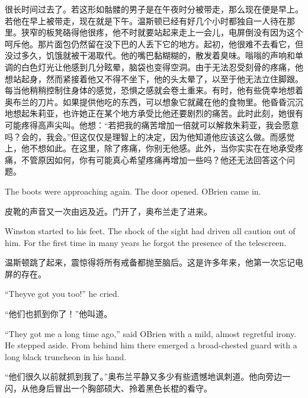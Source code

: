 \begin{paracol}{2}
\switchcolumn

很长时间过去了。若这形如骷髅的男子是在午夜时分被带走，那么现在便是早上。若他在早上被带走，现在就是下午。温斯顿已经有好几个小时都独自一人待在那里。狭窄的板凳硌得他很疼，他不时就要站起来走上一会儿，电屏倒没有因为这个呵斥他。那片面包仍然留在没下巴的人丢下它的地方。起初，他很难不去看它，但没过多久，饥饿就被干渴取代。他的嘴巴黏糊糊的，散发着臭味。嗡嗡的声响和单调的白色灯光让他感到几分眩晕，脑袋也变得空洞。由于无法忍受刻骨的疼痛，他想站起身，然而紧接着他又不得不坐下，他的头太晕了，以至于他无法立住脚跟。每当他稍稍控制住身体的感觉，恐惧之感就会卷土重来。有时，他有些侥幸地想着奥布兰的刀片。如果提供他吃的东西，可以想象它就藏在他的食物里。他昏昏沉沉地想起朱莉亚，也许她正在某个地方承受比他还要剧烈的痛苦。此时此刻，她很有可能疼得高声尖叫。他想：``若把我的痛苦增加一倍就可以解救朱莉亚，我会愿意吗？会的，我会。''但这仅仅是理智上的决定，因为他知道他应该这么做。而感觉上，他不想如此。在这里，除了疼痛，你别无他感。此外，当你实实在在地承受疼痛，不管原因如何，你有可能真心希望疼痛再增加一些吗？他还无法回答这个问题。

\switchcolumn*

The boots were approaching again. The door opened.
O\textquotesingle Brien came in.

\switchcolumn

皮靴的声音又一次由远及近。门开了，奥布兰走了进来。

\switchcolumn*

Winston started to his feet. The shock of the sight had driven all
caution out of him. For the first time in many years he forgot the
presence of the telescreen.

\switchcolumn

温斯顿跳了起来，震惊得将所有戒备都抛至脑后。这是许多年来，他第一次忘记电屏的存在。

\switchcolumn*

``They\textquotesingle ve got you too!'' he cried.

\switchcolumn

``他们也抓到你了！''他叫道。

\switchcolumn*

``They got me a long time ago,'' said O\textquotesingle Brien with a mild,
almost regretful irony. He stepped aside. From behind him there emerged
a broad-chested guard with a long black truncheon in his hand.

\switchcolumn

``他们很久以前就抓到我了。''奥布兰平静又多少有些遗憾地讽刺道。他向旁边一闪，从他身后冒出一个胸部硕大、拎着黑色长棍的看守。


\end{paracol}
